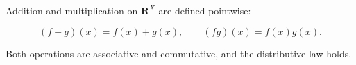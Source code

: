 Addition and multiplication on $\mathbf{R}^X$ are defined pointwise:

$$(f + g)(x) = f(x) + g(x), \qquad (fg)(x) = f(x)g(x).$$

Both operations are associative and commutative, and the distributive law holds.
